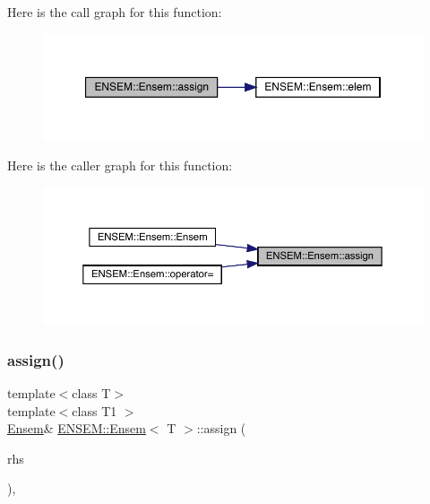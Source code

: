 Here is the call graph for this function\+:
\nopagebreak
\begin{figure}[H]
\begin{center}
\leavevmode
\includegraphics[width=350pt]{d7/d3e/classENSEM_1_1Ensem_aa09448269bc5b72687905254739bf69a_cgraph}
\end{center}
\end{figure}
Here is the caller graph for this function\+:
\nopagebreak
\begin{figure}[H]
\begin{center}
\leavevmode
\includegraphics[width=350pt]{d7/d3e/classENSEM_1_1Ensem_aa09448269bc5b72687905254739bf69a_icgraph}
\end{center}
\end{figure}
\mbox{\label{classENSEM_1_1Ensem_aa09448269bc5b72687905254739bf69a}} 
\subsubsection{\texorpdfstring{assign()}{assign()}\hspace{0.1cm}{\footnotesize\ttfamily [2/12]}}
{\footnotesize\ttfamily template$<$class T$>$ \\
template$<$class T1 $>$ \\
\mbox{\hyperlink{classENSEM_1_1Ensem}{Ensem}}\& \mbox{\hyperlink{classENSEM_1_1Ensem}{E\+N\+S\+E\+M\+::\+Ensem}}$<$ T $>$\+::assign (\begin{DoxyParamCaption}\item[{const \mbox{\hyperlink{classENSEM_1_1EScalar}{E\+Scalar}}$<$ T1 $>$ \&}]{rhs }\end{DoxyParamCaption})\hspace{0.3cm}{\ttfamily [inline]}, {\ttfamily [protected]}}



